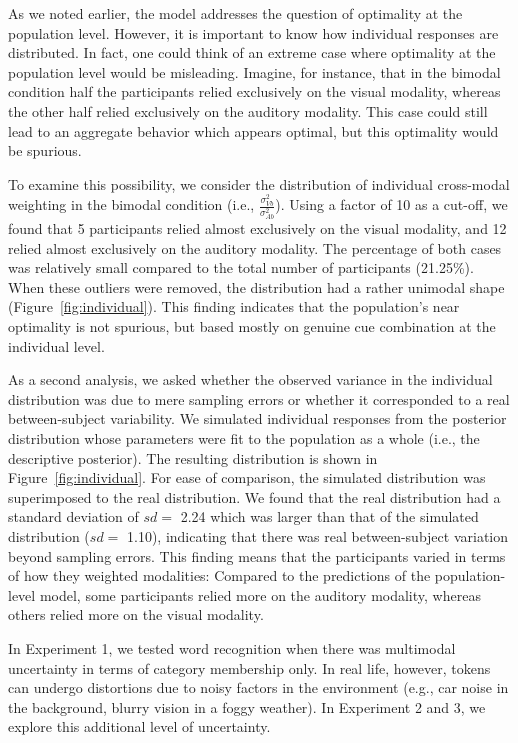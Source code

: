 \documentclass[english,floatsintext,man]{apa6}
\theoremstyle{definition}
\theoremstyle{definition}
\theoremstyle{definition}
\theoremstyle{remark}
\begin{document}
As we noted earlier, the model addresses the question of optimality at
the population level. However, it is important to know how individual
responses are distributed. In fact, one could think of an extreme case
where optimality at the population level would be misleading. Imagine,
for instance, that in the bimodal condition half the participants relied
exclusively on the visual modality, whereas the other half relied
exclusively on the auditory modality. This case could still lead to an
aggregate behavior which appears optimal, but this optimality would be
spurious.

To examine this possibility, we consider the distribution of individual
cross-modal weighting in the bimodal condition (i.e.,
\(\frac{\sigma^2_{Vb}}{\sigma^2_{Ab}}\)). Using a factor of 10 as a
cut-off, we found that 5 participants relied almost exclusively on the
visual modality, and 12 relied almost exclusively on the auditory
modality. The percentage of both cases was relatively small compared to
the total number of participants (21.25\%). When these outliers were
removed, the distribution had a rather unimodal shape
(Figure~\ref{fig:individual}). This finding indicates that the
population's near optimality is not spurious, but based mostly on
genuine cue combination at the individual level.

As a second analysis, we asked whether the observed variance in the
individual distribution was due to mere sampling errors or whether it
corresponded to a real between-subject variability. We simulated
individual responses from the posterior distribution whose parameters
were fit to the population as a whole (i.e., the descriptive posterior).
The resulting distribution is shown in Figure~\ref{fig:individual}. For
ease of comparison, the simulated distribution was superimposed to the
real distribution. We found that the real distribution had a standard
deviation of \(sd=\) 2.24 which was larger than that of the simulated
distribution (\(sd=\) 1.10), indicating that there was real
between-subject variation beyond sampling errors. This finding means
that the participants varied in terms of how they weighted modalities:
Compared to the predictions of the population-level model, some
participants relied more on the auditory modality, whereas others relied
more on the visual modality.

In Experiment 1, we tested word recognition when there was multimodal
uncertainty in terms of category membership only. In real life, however,
tokens can undergo distortions due to noisy factors in the environment
(e.g., car noise in the background, blurry vision in a foggy weather).
In Experiment 2 and 3, we explore this additional level of uncertainty.
\end{document}
